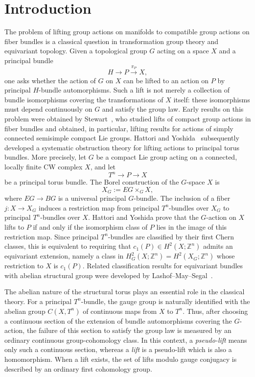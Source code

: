 \documentclass[11pt,a4paper]{article}
\numberwithin{equation}{section}
\theoremstyle{named}
\begin{document}
\tableofcontents

\section{Introduction}

The problem of lifting group actions on manifolds to compatible group actions on fiber bundles is a classical question in transformation group theory and equivariant topology. Given a topological group \(G\) acting on a space \(X\) and a principal bundle \[ H\longrightarrow P\overset{\pi_P}{\longrightarrow}X, \] one asks whether the action of \(G\) on \(X\) can be lifted to an action on \(P\) by principal \(H\)-bundle automorphisms. Such a lift is not merely a collection of bundle isomorphisms covering the transformations of \(X\) itself: these isomorphisms must depend continuously on \(G\) and satisfy the group law.
 Early results on this problem were obtained by Stewart~\cite{steward}, who studied lifts of compact group actions in fiber bundles and obtained, in particular, lifting results for actions of simply connected semisimple compact Lie groups. Hattori and Yoshida~\cite{hatyos} subsequently developed a systematic obstruction theory for lifting actions to principal torus bundles. More precisely, let \(G\) be a compact Lie group acting on a connected, locally finite CW complex \(X\), and let
\[
T^n\longrightarrow P\longrightarrow X
\]
be a principal torus bundle. The Borel construction of the \(G\)-space \(X\) is
\[
X_G:=EG\times_G X,
\]
where \(EG\to BG\) is a universal principal \(G\)-bundle. The inclusion of a fiber $j:X\longrightarrow X_G$ induces a restriction map from principal \(T^n\)-bundles over \(X_G\) to principal \(T^n\)-bundles over \(X\). Hattori and Yoshida prove that the \(G\)-action on \(X\) lifts to \(P\) if and only if the isomorphism class of \(P\) lies in the image of this restriction map. Since principal \(T^n\)-bundles are classified by their first Chern classes, this is equivalent to requiring that $c_1(P)\in H^2(X;\mathbb Z^n)$ admits an equivariant extension, namely a class in $H_G^2(X;\mathbb Z^n)=H^2(X_G;\mathbb Z^n)$ whose restriction to \(X\) is \(c_1(P)\). Related classification results for equivariant bundles with abelian structural group were developed by Lashof--May--Segal~\cite{lms}.

The abelian nature of the structural torus plays an essential role in the classical theory. For a principal \(T^n\)-bundle, the gauge group is naturally identified with the abelian group \(C(X,T^n)\) of continuous maps from \(X\) to \(T^n\). Thus, after choosing a continuous section of the extension of bundle automorphisms covering the \(G\)-action, the failure of this section to satisfy the group law is measured by an ordinary continuous group-cohomology class. In this context, a \emph{pseudo-lift} means only such a continuous section, whereas a \emph{lift} is a pseudo-lift which is also a homomorphism. When a lift exists, the set of lifts modulo gauge conjugacy is described by an ordinary first cohomology group.
\end{document}
